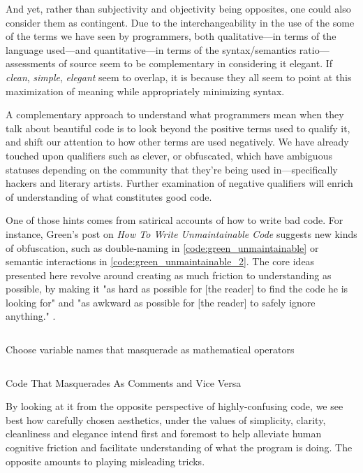 And yet, rather than subjectivity and objectivity being opposites, one could also consider them as contingent. Due to the interchangeability in the use of the some of the terms we have seen by programmers, both qualitative—in terms of the language used—and quantitative—in terms of the syntax/semantics ratio—assessments of source seem to be complementary in considering it elegant. If \emph{clean}, \emph{simple}, \emph{elegant} seem to overlap, it is because they all seem to point at this maximization of meaning while appropriately minimizing syntax.

A complementary approach to understand what programmers mean when they talk about beautiful code is to look beyond the positive terms used to qualify it, and shift our attention to how other terms are used negatively. We have already touched upon qualifiers such as clever, or obfuscated, which have ambiguous statuses depending on the community that they're being used in—specifically hackers and literary artists. Further examination of negative qualifiers will enrich of understanding of what constitutes good code.

One of those hints comes from satirical accounts of how to write bad code. For instance, Green's post on \emph{ How To Write Unmaintainable Code} suggests new kinds of obfuscation, such as double-naming in \ref{code:green_unmaintainable} or semantic interactions in \ref{code:green_unmaintainable_2}. The core ideas presented here revolve around creating as much friction to understanding as possible, by making it "as hard as possible for [the reader] to find the code he is looking for" and "as awkward as possible for [the reader] to safely ignore anything." \citep{green_how_2006}.

\begin{listing}
  \inputminted{python}{./corpus/unmaintainable.py}
  \caption{Choose variable names that masquerade as mathematical operators}
  \label{code:green_unmaintainable}
\end{listing}

\begin{listing}
  \inputminted{c}{./corpus/unmaintainable_2.c}
  \caption{Code That Masquerades As Comments and Vice Versa}
  \label{code:green_unmaintainable_2}
\end{listing}

By looking at it from the opposite perspective of highly-confusing code, we see best how carefully chosen aesthetics, under the values of simplicity, clarity, cleanliness and elegance intend first and foremost to help alleviate human cognitive friction and facilitate understanding of what the program is doing. The opposite amounts to playing misleading tricks.

